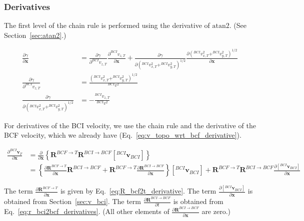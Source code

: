 \documentclass[]{article}
\newcommand{\vb}[1]{\bm{#1}} %
\newcommand{\pd}[2]{\frac{\partial #1}{\partial #2}} %
\begin{document}
\subsubsection{Derivatives}

The first level of the chain rule is performed using the derivative of $\mathrm{atan2}$. (See Section~\ref{sec:atan2}.)

\begin{align}
\pd{\gamma}{\vb{x}} &= \pd{\gamma}{^{BCI} v_{z, T}} \pd{^{BCI} v_{z, T}}{\vb{x}} + \pd{\gamma}{ \left( ^{BCI} v_{x, T}^2 + ^{BCI} v_{y, T}^2 \right)^{1/2}} \pd{\left( ^{BCI} v_{x, T}^2 + ^{BCI} v_{y, T}^2 \right)^{1/2}}{\vb{x}} \\
\pd{\gamma}{^{BCI} v_{z, T}} &= \frac{\left( ^{BCI} v_{x, T}^2 + ^{BCI} v_{y, T}^2 \right)^{1/2}}{^{BCI} v^2} \\
\pd{\gamma}{ \left( ^{BCI} v_{x, T}^2 + ^{BCI} v_{y, T}^2 \right)^{1/2}} &= -\frac{^{BCI} v_{z, T}}{^{BCI} v^2}
\end{align}

For derivatives of the BCI velocity, we use the chain rule and the derivative of the BCF velocity, which we already have (Eq.~\eqref{eq:v_topo_wrt_bcf_derivative}).

\begin{align}
	\pd{^{BCI} \vb{v}_T}{\vb{x}} &= \pd{}{\vb{x}} \left\{ \vb{R}^{BCF \rightarrow T} \vb{R}^{BCI \rightarrow BCF} \left[^{BCI} \vb{v}_{BCI} \right] \right\} \\
	&= \left\{ \pd{\vb{R}^{BCF \rightarrow T}}{\vb{x}} \vb{R}^{BCI \rightarrow BCF} + \vb{R}^{BCF \rightarrow T} \pd{\vb{R}^{BCI \rightarrow BCF}}{\vb{x}} \right\} \left[ ^{BCI} \vb{v}_{BCI} \right] +  \vb{R}^{BCF \rightarrow T} \vb{R}^{BCI \rightarrow BCF} \pd{\left[^{BCI} \vb{v}_{BCI} \right]}{\vb{x}}
\end{align}

The term $\pd{\vb{R}^{BCF \rightarrow T}}{\vb{x}}$ is given by Eq.~\eqref{eq:R_bcf2t_derivative}. The term $\pd{\left[^{BCI} \vb{v}_{BCI} \right]}{\vb{x}}$ is obtained from Section~\ref{sec:v_bci}. The term $\pd{\vb{R}^{BCI \rightarrow BCF}}{t}$ is obtained from Eq.~\eqref{eq:r_bci2bcf_derivatives}. (All other elements of $\pd{\vb{R}^{BCI \rightarrow BCF}}{\vb{x}}$ are zero.)

%
\end{document}
